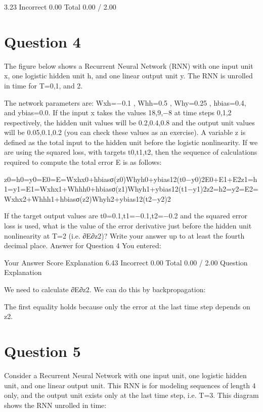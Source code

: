 3.23	Incorrect	0.00	
Total		0.00 / 2.00	
\newpage
\section*{Question 4}
The figure below shows a Recurrent Neural Network (RNN) with one input unit x, one logistic hidden unit h, and one linear output unit y. The RNN is unrolled in time for T=0,1, and 2. 



The network parameters are: Wxh=−0.1 , Whh=0.5 , Why=0.25 , hbias=0.4, and ybias=0.0. 
If the input x takes the values 18,9,−8 at time steps 0,1,2 respectively, the hidden unit values will be 0.2,0.4,0.8 and the output unit values will be 0.05,0.1,0.2 (you can check these values as an exercise). A variable z is defined as the total input to the hidden unit before the logistic nonlinearity.
If we are using the squared loss, with targets t0,t1,t2, then the sequence of calculations required to compute the total error E is as follows:

z0=h0=y0=E0=E=Wxhx0+hbiasσ(z0)Whyh0+ybias12(t0−y0)2E0+E1+E2z1=h1=y1=E1=Wxhx1+Whhh0+hbiasσ(z1)Whyh1+ybias12(t1−y1)2z2=h2=y2=E2=Wxhx2+Whhh1+hbiasσ(z2)Whyh2+ybias12(t2−y2)2

If the target output values are t0=0.1,t1=−0.1,t2=−0.2 and the squared error loss is used, what is the value of the error derivative just before the hidden unit nonlinearity at T=2 (i.e. ∂E∂z2)? Write your answer up to at least the fourth decimal place.
Answer for Question 4
You entered:

Your Answer		Score	Explanation
6.43	Incorrect	0.00	
Total		0.00 / 2.00	
Question Explanation

We need to calculate ∂E∂z2. We can do this by backpropagation:


The first equality holds because only the error at the last time step depends on z2.
\newpage
\section*{Question 5}
Consider a Recurrent Neural Network with one input unit, one logistic hidden unit, and one linear output unit. This RNN is for modeling sequences of length 4 only, and the output unit exists only at the last time step, i.e. T=3. This diagram shows the RNN unrolled in time:


